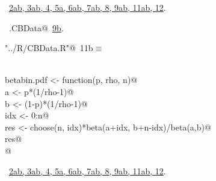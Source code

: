 \documentclass[reqno]{amsart}
\renewcommand{\NWtarget}[2]{\hypertarget{#1}{#2}}
\renewcommand{\NWlink}[2]{\hyperlink{#1}{#2}}
\begin{document}
\begin{flushleft}
\begin{minipage}{\linewidth}
\begin{list}{}{}
\mbox{}\verb@@{\NWsep}
\end{list}
\vspace{-1.5ex}
\footnotesize
\begin{list}{}{\setlength{\itemsep}{-\parsep}\setlength{\itemindent}{-\leftmargin}}
\item \NWtxtFileDefBy\ \NWlink{nuweb2a}{2a}\NWlink{nuweb2b}{b}\NWlink{nuweb3a}{, 3a}\NWlink{nuweb3b}{b}\NWlink{nuweb4}{, 4}\NWlink{nuweb5a}{, 5a}\NWlink{nuweb6a}{, 6a}\NWlink{nuweb6b}{b}\NWlink{nuweb7a}{, 7a}\NWlink{nuweb7b}{b}\NWlink{nuweb8}{, 8}\NWlink{nuweb9a}{, 9a}\NWlink{nuweb9b}{b}\NWlink{nuweb11a}{, 11a}\NWlink{nuweb11b}{b}\NWlink{nuweb12}{, 12}.
\item \NWtxtIdentsUsed\nobreak\  \verb@ran.CBData@\nobreak\ \NWlink{nuweb9b}{9b}.
\item{}
\end{list}
\end{minipage}\vspace{4ex}
\end{flushleft}
\begin{flushleft} \small\label{scrap17}\raggedright\small
\NWtarget{nuweb11b}{} \verb@"../R/CBData.R"@\nobreak\ {\footnotesize {11b}}$\equiv$
\vspace{-1ex}
\begin{list}{}{} \item
\mbox{}\verb@@\\
\mbox{}\verb@ betabin.pdf <- function(p, rho, n){@\\
\mbox{}\verb@   a <- p*(1/rho-1)@\\
\mbox{}\verb@   b <- (1-p)*(1/rho-1)@\\
\mbox{}\verb@   idx <- 0:n@\\
\mbox{}\verb@   res <- choose(n, idx)*beta(a+idx, b+n-idx)/beta(a,b)@\\
\mbox{}\verb@   res@\\
\mbox{}\verb@  } @\\
\mbox{}\verb@@{\NWsep}
\end{list}
\vspace{-1.5ex}
\footnotesize
\begin{list}{}{\setlength{\itemsep}{-\parsep}\setlength{\itemindent}{-\leftmargin}}
\item \NWtxtFileDefBy\ \NWlink{nuweb2a}{2a}\NWlink{nuweb2b}{b}\NWlink{nuweb3a}{, 3a}\NWlink{nuweb3b}{b}\NWlink{nuweb4}{, 4}\NWlink{nuweb5a}{, 5a}\NWlink{nuweb6a}{, 6a}\NWlink{nuweb6b}{b}\NWlink{nuweb7a}{, 7a}\NWlink{nuweb7b}{b}\NWlink{nuweb8}{, 8}\NWlink{nuweb9a}{, 9a}\NWlink{nuweb9b}{b}\NWlink{nuweb11a}{, 11a}\NWlink{nuweb11b}{b}\NWlink{nuweb12}{, 12}.

\item{}
\end{list}
\vspace{4ex}
\end{flushleft}
\end{document}
